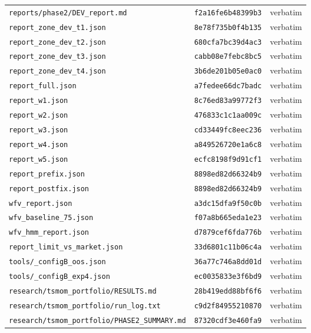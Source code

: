 {\begin{longtable}{@{}>{\raggedright\arraybackslash}p{8.6cm}p{2.7cm}>{\raggedright\arraybackslash}p{3.4cm}@{}}
\texttt{reports/\allowbreak{}phase2/\allowbreak{}DEV\_report.md} & \texttt{f2a16fe6b48399b3} & verbatim \\
\texttt{report\_zone\_dev\_t1.json} & \texttt{8e78f735b0f4b135} & verbatim \\
\texttt{report\_zone\_dev\_t2.json} & \texttt{680cfa7bc39d4ac3} & verbatim \\
\texttt{report\_zone\_dev\_t3.json} & \texttt{cabb08e7febc8bc5} & verbatim \\
\texttt{report\_zone\_dev\_t4.json} & \texttt{3b6de201b05e0ac0} & verbatim \\
\texttt{report\_full.json} & \texttt{a7fedee66dc7badc} & verbatim \\
\texttt{report\_w1.json} & \texttt{8c76ed83a99772f3} & verbatim \\
\texttt{report\_w2.json} & \texttt{476833c1c1aa009c} & verbatim \\
\texttt{report\_w3.json} & \texttt{cd33449fc8eec236} & verbatim \\
\texttt{report\_w4.json} & \texttt{a849526720e1a6c8} & verbatim \\
\texttt{report\_w5.json} & \texttt{ecfc8198f9d91cf1} & verbatim \\
\texttt{report\_prefix.json} & \texttt{8898ed82d66324b9} & verbatim \\
\texttt{report\_postfix.json} & \texttt{8898ed82d66324b9} & verbatim \\
\texttt{wfv\_report.json} & \texttt{a3dc15dfa9f50c0b} & verbatim \\
\texttt{wfv\_baseline\_75.json} & \texttt{f07a8b665eda1e23} & verbatim \\
\texttt{wfv\_hmm\_report.json} & \texttt{d7879cef6fda776b} & verbatim \\
\texttt{report\_limit\_vs\_market.json} & \texttt{33d6801c11b06c4a} & verbatim \\
\texttt{tools/\allowbreak{}\_configB\_oos.json} & \texttt{36a77c746a8dd01d} & verbatim \\
\texttt{tools/\allowbreak{}\_configB\_exp4.json} & \texttt{ec0035833e3f6bd9} & verbatim \\
\texttt{research/\allowbreak{}tsmom\_portfolio/\allowbreak{}RESULTS.md} & \texttt{28b419edd88bf6f6} & verbatim \\
\texttt{research/\allowbreak{}tsmom\_portfolio/\allowbreak{}run\_log.txt} & \texttt{c9d2f84955210870} & verbatim \\
\texttt{research/\allowbreak{}tsmom\_portfolio/\allowbreak{}PHASE2\_SUMMARY.md} & \texttt{87320cdf3e460fa9} & verbatim \\

\end{longtable}}
